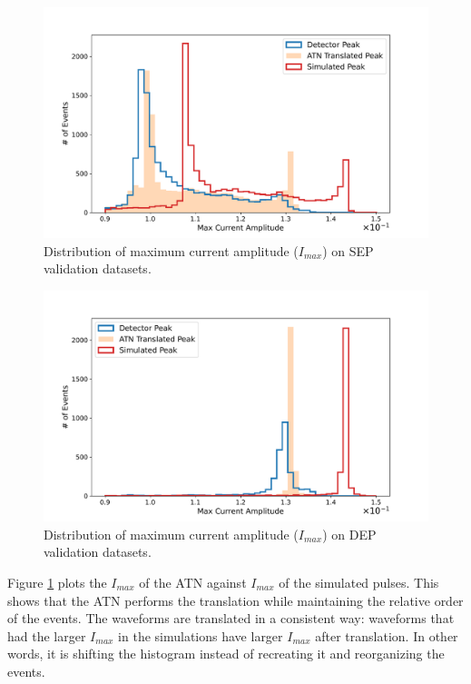 \begin{figure}%
\centering
\includegraphics[width=0.9\linewidth,trim={0pc 0pc 0pc 0pc},clip]{ch8/figs/SEP_amp.pdf}
\caption{ Distribution of maximum current amplitude ($I_{max}$) on SEP validation datasets.}
\label{ch8_fig_current_amp_sep}
\end{figure}

\begin{figure}%
\centering
\includegraphics[width=0.9\linewidth,trim={0pc 0pc 0pc 0pc},clip]{ch8/figs/DEP_amp.pdf}
\caption{ Distribution of maximum current amplitude ($I_{max}$) on DEP validation datasets.}
\label{ch8_fig_current_amp_dep}
\end{figure}

Figure \ref{ch8_fig_current_amp_sep} plots the $I_{max}$ of the ATN against $I_{max}$ of the simulated pulses. This shows that the ATN performs the translation while maintaining the relative order of the events. The waveforms are translated in a consistent way: waveforms that had the larger $I_{max}$ in the simulations have larger $I_{max}$ after translation. In other words, it is shifting the histogram instead of recreating it and reorganizing the events.

